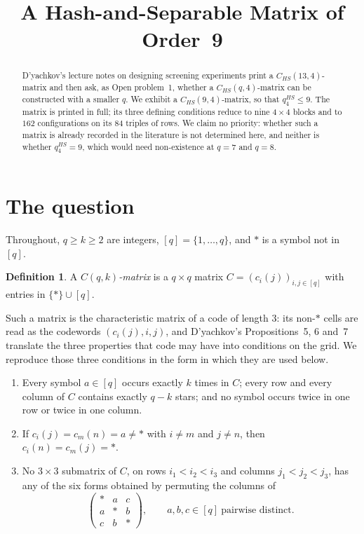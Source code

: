 \documentclass[11pt]{amsart}
\title[A hash-and-separable matrix of order 9]
{A Hash-and-Separable Matrix of Order~9}
\date{}
\theoremstyle{definition}
\newtheorem*{definition}{Definition}
\theoremstyle{remark}
\newcommand{\st}{\ast}
\begin{document}
\begin{abstract}
D'yachkov's lecture notes on designing screening experiments print a
$C_{HS}(13,4)$-matrix and then ask, as Open problem~1, whether a
$C_{HS}(q,4)$-matrix can be constructed with a smaller $q$. We exhibit a
$C_{HS}(9,4)$-matrix, so that $q_4^{HS}\le 9$. The matrix is
printed in full; its three defining conditions reduce to nine $4\times4$ blocks
and to $162$ configurations on its $84$ triples of rows. We claim no priority:
whether such a matrix is already recorded in the literature is not determined
here, and neither is whether $q_4^{HS}=9$, which would need non-existence at
$q=7$ and $q=8$.
\end{abstract}

\maketitle

\section{The question}

Throughout, $q\ge k\ge 2$ are integers, $[q]=\{1,\dots,q\}$, and $\st$ is a
symbol not in $[q]$.

\begin{definition}
A \emph{$C(q,k)$-matrix} is a $q\times q$ matrix $C=(c_i(j))_{i,j\in[q]}$ with
entries in $\{\st\}\cup[q]$.
\end{definition}

Such a matrix is the characteristic matrix of a code of length $3$: its
non-$\st$ cells are read as the codewords $(c_i(j),i,j)$, and D'yachkov's
Propositions~5, 6 and~7 \cite{Dya} translate the three properties that code may
have into conditions on the grid. We reproduce those three conditions in the
form in which they are used below.

\begin{enumerate}
\item[(P5)] Every symbol $a\in[q]$ occurs exactly $k$ times in $C$; every row
and every column of $C$ contains exactly $q-k$ stars; and no symbol occurs
twice in one row or twice in one column.

\item[(P6)] If $c_i(j)=c_m(n)=a\ne\st$ with $i\ne m$ and $j\ne n$, then
$c_i(n)=c_m(j)=\st$.

\item[(P7)] No $3\times3$ submatrix of $C$, on rows $i_1<i_2<i_3$ and columns
$j_1<j_2<j_3$, has any of the six forms obtained by permuting the columns of
\[
\begin{pmatrix}
\st & a & c\\
a & \st & b\\
c & b & \st
\end{pmatrix},
\qquad a,b,c\in[q]\ \text{pairwise distinct.}
\]
\end{enumerate}
\end{document}
